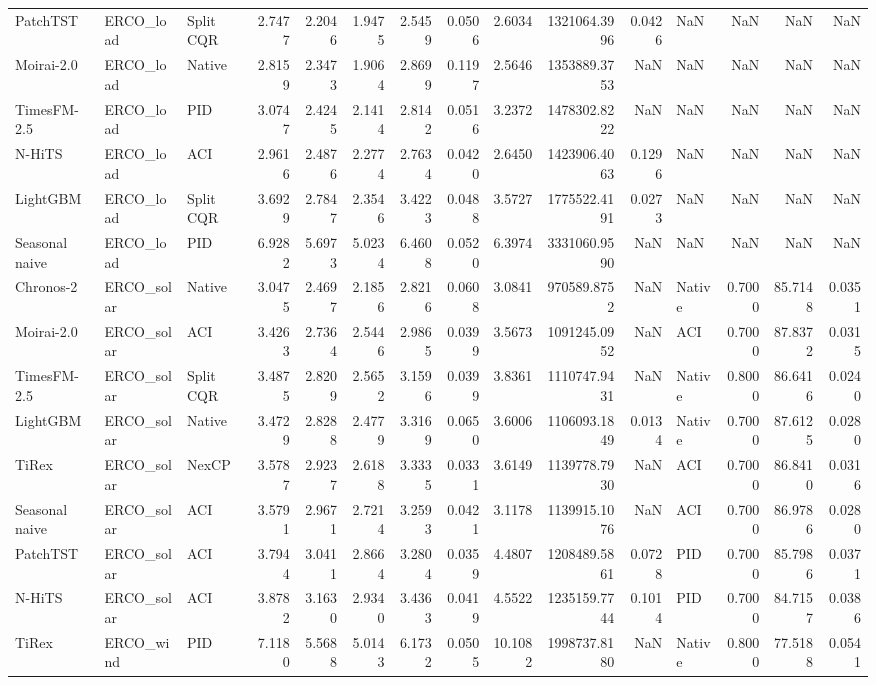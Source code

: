 \begin{tabular}{lllrrrrrrrrlrrr}
PatchTST & ERCO_load & Split CQR & 2.7477 & 2.2046 & 1.9475 & 2.5459 & 0.0506 & 2.6034 & 1321064.3996 & 0.0426 & NaN & NaN & NaN & NaN \\
Moirai-2.0 & ERCO_load & Native & 2.8159 & 2.3473 & 1.9064 & 2.8699 & 0.1197 & 2.5646 & 1353889.3753 & NaN & NaN & NaN & NaN & NaN \\
TimesFM-2.5 & ERCO_load & PID & 3.0747 & 2.4245 & 2.1414 & 2.8142 & 0.0516 & 3.2372 & 1478302.8222 & NaN & NaN & NaN & NaN & NaN \\
N-HiTS & ERCO_load & ACI & 2.9616 & 2.4876 & 2.2774 & 2.7634 & 0.0420 & 2.6450 & 1423906.4063 & 0.1296 & NaN & NaN & NaN & NaN \\
LightGBM & ERCO_load & Split CQR & 3.6929 & 2.7847 & 2.3546 & 3.4223 & 0.0488 & 3.5727 & 1775522.4191 & 0.0273 & NaN & NaN & NaN & NaN \\
Seasonal naive & ERCO_load & PID & 6.9282 & 5.6973 & 5.0234 & 6.4608 & 0.0520 & 6.3974 & 3331060.9590 & NaN & NaN & NaN & NaN & NaN \\
Chronos-2 & ERCO_solar & Native & 3.0475 & 2.4697 & 2.1856 & 2.8216 & 0.0608 & 3.0841 & 970589.8752 & NaN & Native & 0.7000 & 85.7148 & 0.0351 \\
Moirai-2.0 & ERCO_solar & ACI & 3.4263 & 2.7364 & 2.5446 & 2.9865 & 0.0399 & 3.5673 & 1091245.0952 & NaN & ACI & 0.7000 & 87.8372 & 0.0315 \\
TimesFM-2.5 & ERCO_solar & Split CQR & 3.4875 & 2.8209 & 2.5652 & 3.1596 & 0.0399 & 3.8361 & 1110747.9431 & NaN & Native & 0.8000 & 86.6416 & 0.0240 \\
LightGBM & ERCO_solar & Native & 3.4729 & 2.8288 & 2.4779 & 3.3169 & 0.0650 & 3.6006 & 1106093.1849 & 0.0134 & Native & 0.7000 & 87.6125 & 0.0280 \\
TiRex & ERCO_solar & NexCP & 3.5787 & 2.9237 & 2.6188 & 3.3335 & 0.0331 & 3.6149 & 1139778.7930 & NaN & ACI & 0.7000 & 86.8410 & 0.0316 \\
Seasonal naive & ERCO_solar & ACI & 3.5791 & 2.9671 & 2.7214 & 3.2593 & 0.0421 & 3.1178 & 1139915.1076 & NaN & ACI & 0.7000 & 86.9786 & 0.0280 \\
PatchTST & ERCO_solar & ACI & 3.7944 & 3.0411 & 2.8664 & 3.2804 & 0.0359 & 4.4807 & 1208489.5861 & 0.0728 & PID & 0.7000 & 85.7986 & 0.0371 \\
N-HiTS & ERCO_solar & ACI & 3.8782 & 3.1630 & 2.9340 & 3.4363 & 0.0419 & 4.5522 & 1235159.7744 & 0.1014 & PID & 0.7000 & 84.7157 & 0.0386 \\
TiRex & ERCO_wind & PID & 7.1180 & 5.5688 & 5.0143 & 6.1732 & 0.0505 & 10.1082 & 1998737.8180 & NaN & Native & 0.8000 & 77.5188 & 0.0541 \\

\end{tabular}
